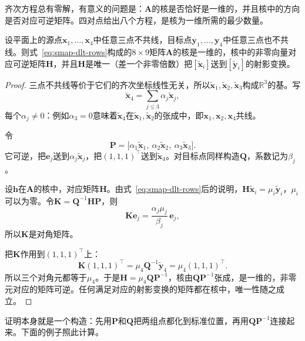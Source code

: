 齐次方程总有零解，有意义的问题是：$\bm A$的核是否恰好是一维的，并且核中的方向是否对应可逆矩阵。四对点给出八个方程，是核为一维所需的最少数量。

\begin{theorem}[四对点确定射影变换]
\label{thm:smap-four-points}
设平面上的源点$\bm x_1,\ldots,\bm x_4$中任意三点不共线，目标点$\bm y_1,\ldots,\bm y_4$中任意三点也不共线。则式~\eqref{eq:smap-dlt-rows}构成的$8\times9$矩阵$\bm A$的核是一维的，核中的非零向量对应可逆矩阵$\bm H$，并且$\bm H$是唯一（差一个非零倍数）把$[\widetilde{\bm x}_i]$送到$[\widetilde{\bm y}_i]$的射影变换。
\end{theorem}
\begin{proof}
三点不共线等价于它们的齐次坐标线性无关，所以$\widetilde{\bm x}_1,\widetilde{\bm x}_2,\widetilde{\bm x}_3$构成$\mathbb R^3$的基。写
\[
 \widetilde{\bm x}_4=\sum_{j\leq3}\alpha_j\widetilde{\bm x}_j ,
\]
每个$\alpha_j\neq0$：例如$\alpha_3=0$意味着$\widetilde{\bm x}_4$在$\widetilde{\bm x}_1,\widetilde{\bm x}_2$的张成中，即$\bm x_1,\bm x_2,\bm x_4$共线。

令
\[
 \bm P=\bigl[\alpha_1\widetilde{\bm x}_1,\ \alpha_2\widetilde{\bm x}_2,\ \alpha_3\widetilde{\bm x}_3\bigr].
\]
它可逆，把$\bm e_j$送到$\alpha_j\widetilde{\bm x}_j$，把$(1,1,1)^\top$送到$\widetilde{\bm x}_4$。对目标点同样构造$\bm Q$，系数记为$\beta_j$。

设$\bm h$在$\bm A$的核中，对应矩阵$\bm H$。由式~\eqref{eq:smap-dlt-rows}后的说明，$\bm H\widetilde{\bm x}_i=\mu_i\widetilde{\bm y}_i$，$\mu_i$可以为零。令$\bm K=\bm Q^{-1}\bm H\bm P$，则
\[
 \bm K\bm e_j=\frac{\alpha_j\mu_j}{\beta_j}\,\bm e_j ,
\]
所以$\bm K$是对角矩阵。

把$\bm K$作用到$(1,1,1)^\top$上：
\[
 \bm K(1,1,1)^\top=\mu_4\bm Q^{-1}\widetilde{\bm y}_4=\mu_4(1,1,1)^\top .
\]
所以三个对角元都等于$\mu_4$。于是$\bm H=\mu_4\bm Q\bm P^{-1}$，核由$\bm Q\bm P^{-1}$张成，是一维的，非零元对应的矩阵可逆。任何满足对应的射影变换的矩阵都在核中，唯一性随之成立。
\end{proof}

证明本身就是一个构造：先用$\bm P$和$\bm Q$把两组点都化到标准位置，再用$\bm Q\bm P^{-1}$连接起来。下面的例子照此计算。

